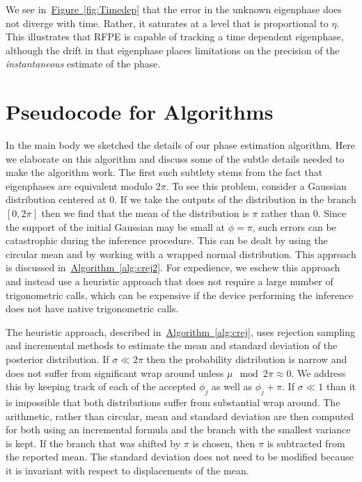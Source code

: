\documentclass[aps,pra,amsmath,twocolumn,amssymb,superscriptaddress]{revtex4-1}
\newcommand{\fig}[1]{\hyperref[fig:#1]{Figure~\ref*{fig:#1}}}
\newcommand{\alg}[1]{\hyperref[alg:#1]{Algorithm~\ref*{alg:#1}}}
\begin{document}
{We see in~\fig{Timedep} that the error in the unknown eigenphase does not diverge with time.  Rather, it saturates at a level that is proportional to $\eta$.  This illustrates that RFPE is capable of tracking a time dependent eigenphase, although the drift in that eigenphase places limitations on the precision of the \emph{instantaneous} estimate of the phase.

\section{Pseudocode for Algorithms}
\label{app:pseudocode}

In the main body we sketched the details of our phase estimation algorithm.  Here we elaborate on this algorithm and discuss some of the
subtle details needed to make the algorithm work.  The first such subtlety stems from the fact that eigenphases are equivalent modulo $2\pi$.  
To see this problem, consider a Gaussian distribution centered at $0$.  If we take the outputs of the distribution in the branch $[0,2\pi]$ then we find that the mean of the distribution is $\pi$ rather than $0$.  Since the support of the initial Gaussian may be small at $\phi=\pi$, such errors can be catastrophic during the inference procedure.  This can be dealt by using the circular mean and by working with a wrapped normal distribution.  This approach is discussed in~\alg{crej2}.  For expedience, we eschew this approach and instead use a heuristic approach that does  not require a large number of trigonometric calls, which can be expensive if the device performing the inference does not have native trigonometric calls.

The heuristic approach, described in~\alg{crej}, uses rejection sampling and incremental methods to estimate the mean and standard deviation of the posterior distribution.  If $\sigma\ll 2\pi$ then the probability distribution is narrow and does not suffer from significant wrap around unless $\mu \mod 2\pi \approx 0$.  We address this by keeping track of each of the accepted $\phi_j$ as well as $\phi_j+\pi$.  If $\sigma\ll 1$ than it is impossible that both distributions suffer from substantial wrap around.  The arithmetic, rather than circular, mean and standard deviation are then computed for both using an incremental formula and the branch with the smallest variance is kept.  If the branch that was shifted by $\pi$ is chosen, then $\pi$ is subtracted from the reported mean.  The standard deviation does not need to be modified because it is invariant with respect to displacements of the mean.

}
\end{document}
